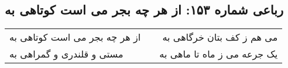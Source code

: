 \begin{center}
\section*{رباعی شماره ۱۵۳: از هر چه بجر می است کوتاهی به}
\label{sec:sh153}
\begin{longtable}{l p{0.5cm} r}
از هر چه بجر می است کوتاهی به
&&
می هم ز کف بتان خرگاهی به
\\
مستی و قلندری و گمراهی به
&&
یک جرعه می ز ماه تا ماهی به
\\
\end{longtable}
\end{center}
